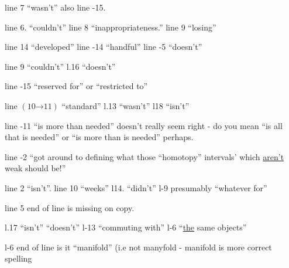 \hangindent=1.2cm line 7 ``wasn't'' also line -15.

\hangindent=1.2cm line 6. ``couldn't'' line 8 ``inappropriateness.'' line 9 ``losing''

\hangindent=1.2cm \hspace*{1.2cm}line 14 ``developed'' line -14 ``handful'' line -5 ``doesn't''

\hangindent=1.2cm line 9 ``couldn't'' l.16 ``doesn't''

\hangindent=1.2cm line -15 ``reserved for'' or ``restricted to''
\reversemarginpar{}\normalmarginpar

\hangindent=1.2cm line $(10\mathord{\to}11)$ ``standard'' l.13 ``wasn't'' l18 ``isn't''

\hangindent=1.2cm \hspace*{1.2cm}line -11 ``is more than needed'' doesn't really seem right - do you mean ``is all that is needed'' or ``is more than is needed'' perhaps.

\hangindent=1.2cm \hspace*{1.2cm}line -2 ``got around to defining  what those ``homotopy'' intervals' which \uline{aren't} weak should be!''

\hangindent=1.2cm line 2 ``isn't''. line 10 ``weeks'' l14. ``didn't'' l-9 presumably ``whatever for''

\hangindent=1.2cm \hspace*{1.2cm}line 5  end of line is missing on copy.

\hangindent=1.2cm l.17 ``isn't'' ``doesn't'' l-13 ``commuting with'' l-6 ``\uline{the} same objects''

\hangindent=1.2cm l-6 end of line is it ``manifold'' (i.e not manyfold\deleted{)} - manifold is  more correct spelling


\endgroup

